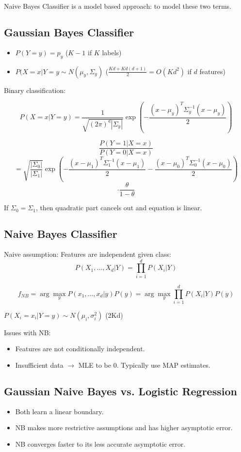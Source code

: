 \documentclass[letterpaper, 10pt, twocolumn]{article}
\begin{document}
Naive Bayes Classifier is a model based approach: to model these two terms.

\subsection{Gaussian Bayes Classifier}

\begin{itemize}
	\item $P(Y=y)=p_y$ ($K-1$ if $K$ labels)
	\item $P(X=x|Y=y \sim N(\mu_y,\Sigma_y)$ ($\frac{Kd+Kd(d+1)}{2}=O(Kd^2)$ if $d$ features)
\end{itemize}

Binary classification:

$$P(X=x|Y=y) = \frac{1}{\sqrt{(2\pi)^d|\Sigma_y|}}\exp(-\frac{(x-\mu_y)^T\Sigma_y^{-1}(x-\mu_y)}{2})$$

$$\frac{P(Y=1|X=x)}{P(Y=0|X=x)}$$
$$=\sqrt{\frac{|\Sigma_0|}{|\Sigma_1|}}\exp(-\frac{(x-\mu_1)^T\Sigma_1^{-1}(x-\mu_1)}{2}-\frac{(x-\mu_0)^T\Sigma_0^{-1}(x-\mu_0)}{2})$$
$$\cdot\frac{\theta}{1-\theta}$$

If $\Sigma_0=\Sigma_1$, then quadratic part cancels out and equation is linear.

\subsection{Naive Bayes Classifier}

Naive assumption: Features are independent given class:
$$P(X_1,\dots,X_d|Y)=\prod_{i=1}^{d}P(X_i|Y)$$

$$f_{NB}=\arg\max_y P(x_1,\dots,x_d|y)P(y)=\arg\max_y \prod_{i=1}^{d}P(X_i|Y)P(y)$$

$P(X_i=x_i|Y=y) \sim N(\mu_i,\sigma_i^2)$ (2Kd)

Issues with NB:
\begin{itemize}
	\item Features are not conditionally independent.
	\item Insufficient data $\rightarrow$ MLE to be 0. Typically use MAP estimates.
\end{itemize}

\subsection{Gaussian Naive Bayes vs. Logistic Regression}

\begin{itemize}
	\item Both learn a linear boundary.
	\item NB makes more restrictive assumptions and has higher asymptotic error.
	\item NB converges faster to its less accurate asymptotic error.
\end{itemize}
\end{document}
